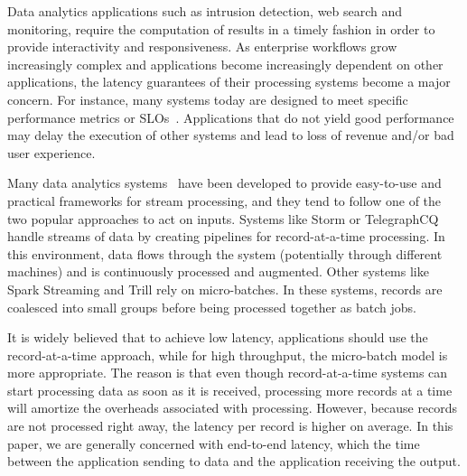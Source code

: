 Data analytics applications such as intrusion detection, web search and monitoring, require the computation of results in a timely fashion in order to provide interactivity and responsiveness. 
As enterprise workflows grow increasingly complex and applications become increasingly dependent on other applications, the latency guarantees of their processing systems become a major concern.
For instance, many systems today are designed to meet specific performance metrics or SLOs~\cite{Jockey}.
Applications that do not yield good performance may delay the execution of other systems and lead to loss of revenue and/or bad user experience.

Many data analytics 
systems~\cite{Millwheel,Babu:2001:CQO:603867.603884,TelegraphCQ,Storm,SparkStreaming,Trill,Naiad,Niagara,StreamInsight,Carney:2002:MSN:1287369.1287389,Sullivan:1998:TSM:1268256.1268258,condie2010mapreduce,Brito:2011:SLD:2114498.2116192, ELF} 
have been developed to provide easy-to-use and practical frameworks for stream processing, and they tend to follow one of the two popular approaches to act on inputs.
Systems like Storm or TelegraphCQ handle streams of data by creating pipelines for record-at-a-time processing. In this environment, data flows through the system (potentially through different machines) and is continuously processed and augmented.
Other systems like Spark Streaming and Trill rely on micro-batches. In these systems, records are coalesced into small groups before being processed together as batch jobs.

It is widely believed that to achieve low latency, applications should use the record-at-a-time approach, while for high throughput, the micro-batch model is more appropriate. 
The reason is that even though record-at-a-time systems can start processing data as soon as it is received, processing more records at a time will amortize the overheads associated with processing.
However, because records are not processed right away, the latency per record is higher on average.
In this paper, we are generally concerned with end-to-end latency, which the time between the application sending to data and the application receiving the output.


